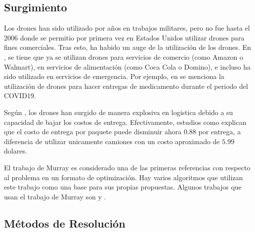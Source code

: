 
\subsection{Surgimiento}

Los drones han sido utilizado por años en trabajos militares, pero no fue hasta el 2006 donde se permitio por primera vez en Estados Unidos utilizar drones para fines comerciales. Tras esto, ha habido un auge de la utilización de los drones. En \cite{moshrefjavadi2021applications}, se tiene que ya se utilizan drones para servicios de comercio (como Amazon o Walmart), en servicios de alimentación (como Coca Cola o Domino), e incluso ha sido utilizado en servicios de emergencia. Por ejemplo, en \cite{stell2022drone} se menciona la utilización de drones para hacer entregas de medicamento durante el periodo del COVID19.

Según \cite{transinfo_drones}, los drones han surgido de manera explosiva en logistica debido a su capacidad de bajar los costos de entrega. Efectivamente, estudios como \cite{moshrefjavadi2021applications} explican que el costo de entrega por paquete puede disminuir ahora $0.88$ por entrega, a diferencia de utilizar unicamente camiones con un costo aproximado de $5.99$ dolares.

El trabajo de Murray \cite{Murray2015Flying} es considerado una de las primeras referencias con respecto al problema en un formato de optimización. Hay varios algoritmos que utilizan este trabajo como una base para sus propias propuestas. Algunos trabajos que usan el trabajo de Murray son \cite{ponza2016optimization} y \cite{freitas2021exact}.

\subsection{Métodos de Resolución}

